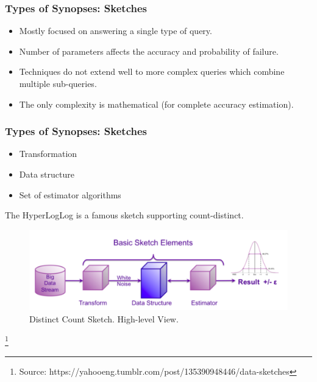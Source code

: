 \documentclass{beamer}
\begin{document}
\begin{frame}
\frametitle{Types of Synopses: Sketches}
\begin{itemize}
\item{Mostly focused on answering a single type of query.}
\item{Number of parameters affects the accuracy and probability of failure.}
\item{Techniques do not extend well to more complex queries which combine multiple sub-queries.}
\item{The only complexity is mathematical (for complete accuracy estimation).}
\end{itemize}
\end{frame}

\begin{frame}
\frametitle{Types of Synopses: Sketches}
\begin{itemize}
\item{Transformation}
\item{Data structure}
\item{Set of estimator algorithms}
\end{itemize}
\vspace{0.1cm}
The HyperLogLog is a famous sketch supporting count-distinct.
\begin{figure}
\includegraphics[scale=0.35]{img/distinct_count_sketches.png}
\caption{Distinct Count Sketch. High-level View.}
\end{figure}
\footnote{\tiny Source: https://yahooeng.tumblr.com/post/135390948446/data-sketches}
\end{frame}
\end{document}
